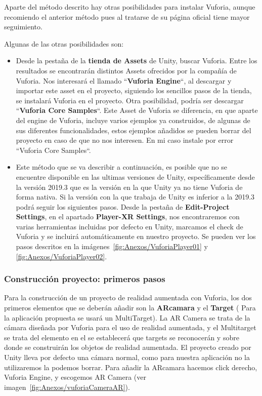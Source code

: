 Aparte del método descrito hay otras posibilidades para instalar Vuforia, aunque recomiendo el anterior método pues al tratarse de su página oficial tiene mayor seguimiento.

Algunas de las otras posibilidades son:
\begin{itemize}
	\item Desde la pestaña de la \textbf{tienda de Assets} de Unity, buscar Vuforia. Entre los resultados se encontrarán distintos Assets ofrecidos por la compañía de Vuforia. Nos interesará el llamado ``\textbf{Vuforia Engine}``, al descargar y importar este asset en el proyecto, siguiendo los sencillos pasos de la tienda, se instalará Vuforia en el proyecto.
	Otra posibilidad, podría ser descargar ``\textbf{Vuforia Core Samples}``. Este Asset de Vuforia se diferencia, en que aparte del engine de Vuforia, incluye varios ejemplos ya construidos, de algunas de sus diferentes funcionalidades, estos ejemplos añadidos se pueden borrar del proyecto en caso de que no nos interesen. En mi caso instale por error ``Vuforia Core Samples``.
	
	\item Este método que se va describir a continuación, es posible que no se encuentre disponible en las ultimas versiones de Unity, específicamente desde la versión 2019.3 que es la versión en la que Unity ya no tiene Vuforia de forma nativa. Si la versión con la que trabaja de Unity es inferior a la 2019.3 podrá seguir los siguientes pasos. Desde la pestaña de \textbf{Edit-Project Settings}, en el apartado \textbf{Player-XR Settings}, nos encontraremos con varias herramientas incluidas por defecto en Unity, marcamos el check de Vuforia y se incluirá automáticamente en nuestro proyecto. Se pueden ver los pasos descritos en la imágenes~\ref{fig:Anexos/VuforiaPlayer01} y \ref{fig:Anexos/VuforiaPlayer02}.
	
\end{itemize}



\subsubsection{Construcción proyecto: primeros pasos}

Para la construcción de un proyecto de realidad aumentada con Vuforia, los dos primeros elementos que se deberán añadir son la \textbf{ARcamara} y el \textbf{Target} ( Para la aplicación propuesta se usará un MultiTarget). La AR Camera se trata de la cámara diseñada por Vuforia para el uso de realidad aumentada, y el Multitarget se trata del elemento en el se establecerá que targets se reconocerán y sobre donde se construirán los objetos de realidad aumentada.
El proyecto creado por Unity lleva por defecto una cámara normal, como para nuestra aplicación no la utilizaremos la podemos borrar.
Para añadir la ARcamara hacemos click derecho, Vuforia Engine, y escogemos AR Camera (ver imagen~\ref{fig:Anexos/vuforiaCameraAR}). 

